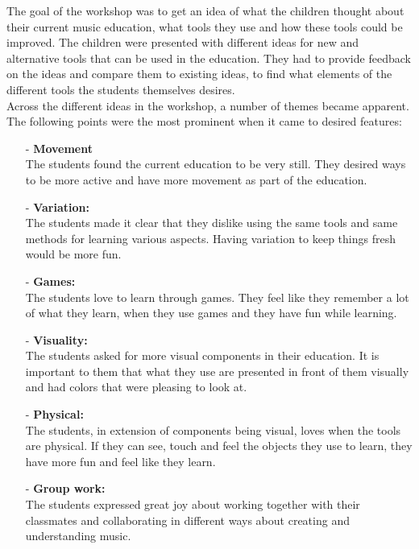 The goal of the workshop was to get an idea of what the children thought about their current music education, what tools they use and how these tools could be improved. The children were presented with different ideas for new and alternative tools that can be used in the education. They had to provide feedback on the ideas and compare them to existing ideas, to find what elements of the different tools the students themselves desires.\\

Across the different ideas in the workshop, a number of themes became apparent. The following points were the most prominent when it came to desired features:\\


\begin{itemize}
	\item[-] \textbf{Movement}\\
	The students found the current education to be very still. They desired ways to be more active and have more movement as part of the education.\\
	\item[-] \textbf{Variation:}\\
	The students made it clear that they dislike using the same tools and same methods for learning various aspects. Having variation to keep things fresh would be more fun.\\
	\item[-] \textbf{Games:}\\
	The students love to learn through games. They feel like they remember a lot of what they learn, when they use games and they have fun while learning. \\
	\item[-] \textbf{Visuality:}\\
	The students asked for more visual components in their education. It is important to them that what they use are presented in front of them visually and had colors that were pleasing to look at.\\
	\item[-] \textbf{Physical:}\\
	The students, in extension of components being visual, loves when the tools are physical. If they can see, touch and feel the objects they use to learn, they have more fun and feel like they learn.\\
	\item[-] \textbf{Group work:}\\
	The students expressed great joy about working together with their classmates and collaborating in different ways about creating and understanding music.\\
	
\end{itemize}



